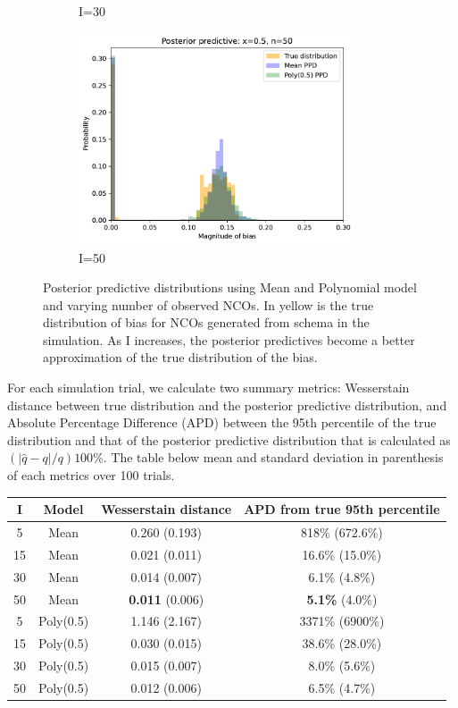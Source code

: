 \begin{figure}[H]
\begin{subfigure}{.45\textwidth}
	\caption{I=30}
\end{subfigure}%
\begin{subfigure}{.45\textwidth}
	\centering
	\includegraphics[width=0.9\textwidth]{figures/one-ppd-lrr-bias-50.pdf}
	\caption{I=50}
\end{subfigure}
\caption{Posterior predictive distributions using Mean and Polynomial model and varying number of observed NCOs. In yellow is the true distribution of bias for NCOs generated from schema in the simulation. As I increases, the posterior predictives become a better approximation of the true distribution of the bias.}
\end{figure}

For each simulation trial, we calculate two summary metrics: Wesserstain distance between true distribution and the posterior predictive distribution, and Absolute Percentage Difference (APD) between the 95th percentile of the true distribution and that of the posterior predictive distribution that is calculated as $(|\hat{q}-q|/q)100$\%. The table below mean and standard deviation in parenthesis of each metrics over 100 trials.

\begin{center}
\begin{tabular}{ |c|c|c|c| } 
\hline
I & Model & Wesserstain distance & APD from true 95th percentile\\ 
\hline
5 & Mean & 0.260 (0.193) & 818\% (672.6\%) \\
15 & Mean & 0.021 (0.011) & 16.6\% (15.0\%) \\
30 & Mean & 0.014 (0.007) & 6.1\% (4.8\%)\\
50 & Mean & \textbf{0.011} (0.006) & \textbf{5.1\%} (4.0\%)\\
5 & Poly(0.5) & 1.146 (2.167) & 3371\% (6900\%)\\
15 & Poly(0.5) & 0.030 (0.015) & 38.6\% (28.0\%)\\
30 & Poly(0.5) & 0.015 (0.007) & 8.0\% (5.6\%)\\
50 & Poly(0.5) & 0.012 (0.006) & 6.5\% (4.7\%)\\
\hline
\end{tabular}
\end{center}

